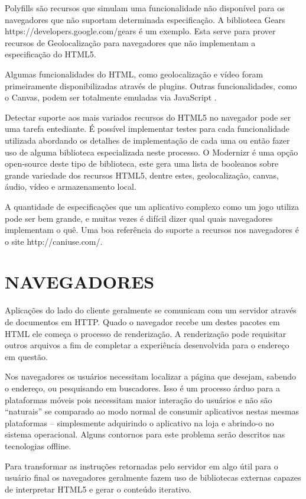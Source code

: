 Polyfills são recursos que simulam uma funcionalidade não disponível para
os navegadores que não suportam determinada especificação. A biblioteca
Gears https://developers.google.com/gears é um exemplo. Esta serve
para prover recursos de Geolocalização para navegadores que não
implementam a especificação do HTML5.

Algumas funcionalidades do HTML, como geolocalização e vídeo foram
primeiramente disponibilizadas através de plugins. 
Outras funcionalidades, como o Canvas, podem ser totalmente
emuladas via JavaScript \autocite{diveIntohtml}.

Detectar suporte aos mais variados recursos do HTML5 no navegador
pode ser uma tarefa entediante. É possível implementar testes para
cada funcionalidade utilizada abordando os detalhes de implementação
de cada uma ou então fazer uso de alguma biblioteca especializada
neste processo. O Modernizr é uma opção open-source deste tipo de
biblioteca, este gera uma lista de booleanos sobre grande variedade dos
recursos HTML5, dentre estes, geolocalização, canvas, áudio, vídeo e
armazenamento local.

A quantidade de especificações que um aplicativo complexo como um jogo
utiliza pode ser bem grande, e muitas vezes é difícil dizer qual quais
navegadores implementam o quê. Uma boa referência do suporte a recursos
nos navegadores é o site http://caniuse.com/.

\section{NAVEGADORES}
Aplicações do lado do cliente geralmente se comunicam com um
servidor através de documentos em HTTP. Quado o navegador recebe um
destes pacotes em HTML ele começa o processo de renderização. A
renderização pode requisitar outros arquivos a fim de completar a
experiência desenvolvida para o endereço em questão.

Nos navegadores os usuários necessitam localizar a página que desejam,
sabendo o endereço, ou pesquisando em buscadores. Isso é um processo
árduo para a plataformas móveis pois necessitam maior interação
do usuários e não são “naturais” se comparado ao modo normal
de consumir aplicativos nestas mesmas plataformas – simplesmente
adquirindo o aplicativo na loja e abrindo-o no sistema operacional.
Alguns contornos para este problema serão descritos nas tecnologias
offline.

Para transformar as instruções retornadas pelo servidor em algo útil
para o usuário final os navegadores geralmente fazem uso de bibliotecas
externas capazes de interpretar HTML5 e gerar o conteúdo iterativo.

